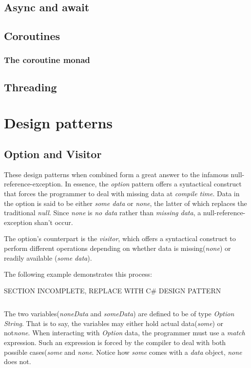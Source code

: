 \documentclass{article}
\begin{document}
\subsection{Async and await}
\subsection{Coroutines}
\subsubsection{The coroutine monad}
\subsection{Threading}

\newpage

\section{Design patterns}

\subsection{Option and Visitor}
These design patterns when combined form a great answer to the infamous null-reference-exception.
In essence, the {\em option} pattern offers a syntactical construct that forces the programmer to deal with missing data at {\em compile time}.
Data in the option is said to be either {\em some data} or {\em none}, the latter of which replaces the traditional {\em null}.
Since {\em none} is {\em no data} rather than {\em missing data}, a null-reference-exception shan't occur.

The option's counterpart is the {\em visitor}, which offers a syntactical construct to perform different operations depending on whether data
is missing({\em none}) or readily available ({\em some data}).

The following example demonstrates this process:

\huge SECTION INCOMPLETE, REPLACE WITH C# DESIGN PATTERN
\begin{lstlisting}[language=Python]
\end{lstlisting}

The two variables({\em noneData} and {\em someData}) are defined to be of type {\em Option String}.
That is to say, the variables may either hold actual data({\em some}) or not{\em none}.
When interacting with {\em Option} data, the programmer must use a {\em match} expression.
Such an expression is forced by the compiler to deal with both possible cases({\em some} and {\em none}.
Notice how {\em some} comes with a {\em data} object, {\em none} does not.
\end{document}
